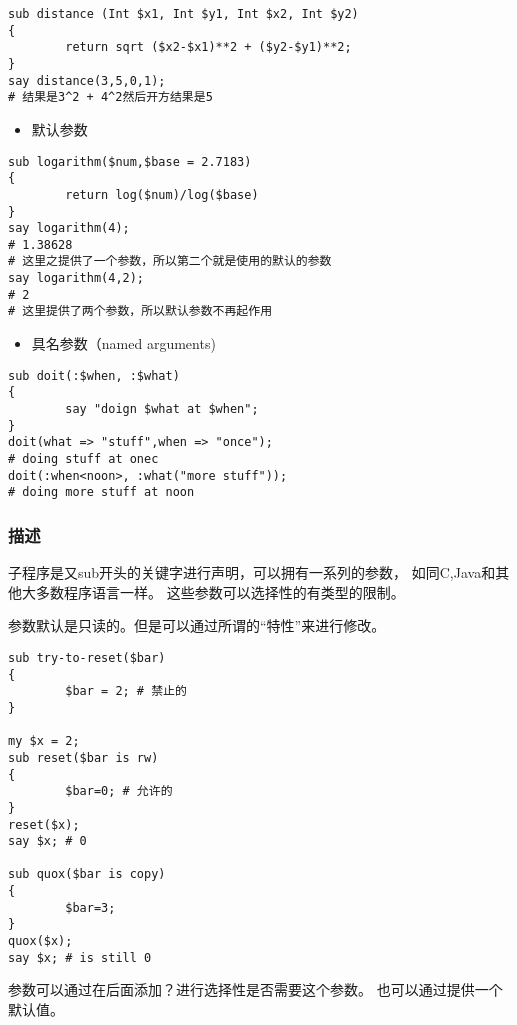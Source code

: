 \documentclass{ctexart}
\begin{document}
\begin{lstlisting}
sub distance (Int $x1, Int $y1, Int $x2, Int $y2)
{
        return sqrt ($x2-$x1)**2 + ($y2-$y1)**2;
}
say distance(3,5,0,1);
# 结果是3^2 + 4^2然后开方结果是5
\end{lstlisting}
\begin{itemize}
\item 默认参数
\end{itemize}

\begin{lstlisting}
sub logarithm($num,$base = 2.7183)
{
        return log($num)/log($base)
}
say logarithm(4);
# 1.38628
# 这里之提供了一个参数，所以第二个就是使用的默认的参数
say logarithm(4,2);
# 2
# 这里提供了两个参数，所以默认参数不再起作用
\end{lstlisting}
\begin{itemize}
\item 具名参数（named arguments)
\end{itemize}

\begin{lstlisting}
sub doit(:$when, :$what)
{
        say "doign $what at $when";
}
doit(what => "stuff",when => "once");
# doing stuff at onec
doit(:when<noon>, :what("more stuff"));
# doing more stuff at noon
\end{lstlisting}
\subsubsection{描述}
\label{sec-4-5-2}

子程序是又sub开头的关键字进行声明，可以拥有一系列的参数，
如同C,Java和其他大多数程序语言一样。
这些参数可以选择性的有类型的限制。

参数默认是只读的。但是可以通过所谓的“特性”来进行修改。

\begin{lstlisting}
sub try-to-reset($bar)
{
        $bar = 2; # 禁止的
}

my $x = 2;
sub reset($bar is rw)
{
        $bar=0; # 允许的
}
reset($x);
say $x; # 0

sub quox($bar is copy)
{
        $bar=3;
}
quox($x);
say $x; # is still 0
\end{lstlisting}
参数可以通过在后面添加？进行选择性是否需要这个参数。
也可以通过提供一个默认值。
\end{document}
